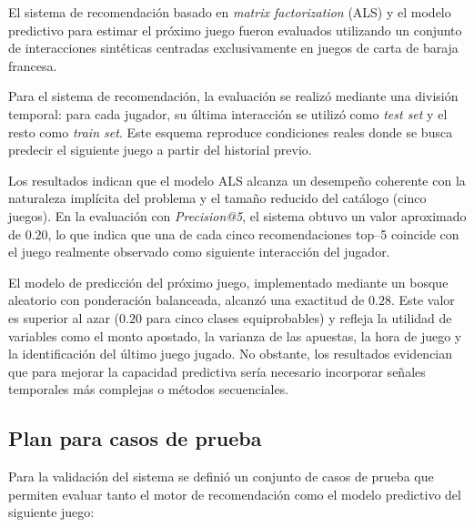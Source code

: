 \documentclass[12pt,a4paper]{article}
\begin{document}
El sistema de recomendación basado en \textit{matrix factorization} (ALS) y el modelo
predictivo para estimar el próximo juego fueron evaluados utilizando un conjunto de
interacciones sintéticas centradas exclusivamente en juegos de carta de baraja francesa.

Para el sistema de recomendación, la evaluación se realizó mediante una división
temporal: para cada jugador, su última interacción se utilizó como \textit{test set} y el resto
como \textit{train set}. Este esquema reproduce condiciones reales donde se busca predecir
el siguiente juego a partir del historial previo.

Los resultados indican que el modelo ALS alcanza un desempeño coherente con la
naturaleza implícita del problema y el tamaño reducido del catálogo (cinco juegos). En la
evaluación con \textit{Precision@5}, el sistema obtuvo un valor aproximado de $0.20$, lo que
indica que una de cada cinco recomendaciones top–5 coincide con el juego realmente
observado como siguiente interacción del jugador.

El modelo de predicción del próximo juego, implementado mediante un bosque
aleatorio con ponderación balanceada, alcanzó una exactitud de $0.28$. Este valor es
superior al azar ($0.20$ para cinco clases equiprobables) y refleja la utilidad de variables
como el monto apostado, la varianza de las apuestas, la hora de juego y la identificación
del último juego jugado. No obstante, los resultados evidencian que para mejorar la
capacidad predictiva sería necesario incorporar señales temporales más complejas o
métodos secuenciales.

\subsection{Plan para casos de prueba}

Para la validación del sistema se definió un conjunto de casos de prueba que permiten
evaluar tanto el motor de recomendación como el modelo predictivo del siguiente juego:
\end{document}
